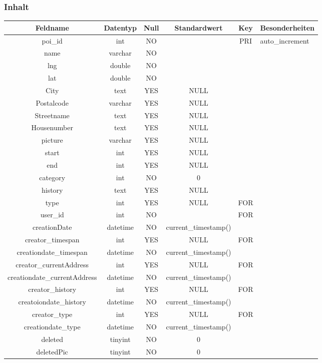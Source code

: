 \subsubsection{Inhalt}
\begin{longtable}[H]{|c|c|c|c|c|p{2.9cm}|}
		\hline
		\textbf{Feldname} & \textbf{Datentyp} & \textbf{Null} & \textbf{Standardwert} & \textbf{Key}   & \textbf{Besonderheiten} \\ \hline
		poi\_id & int & NO &  & PRI & auto\_increment \\ \hline
		name & varchar & NO &  &  & \\ \hline
		lng & double & NO &  &  & \\ \hline
		lat & double & NO &  &  & \\ \hline
		City & text & YES & NULL &  & \\ \hline
		Postalcode & varchar & YES & NULL &  & \\ \hline
		Streetname & text & YES & NULL &  & \\ \hline
		Housenumber & text & YES & NULL &  & \\ \hline
		picture & varchar & YES & NULL &  & \\ \hline
		start & int & YES & NULL &  & \\ \hline
		end & int & YES & NULL &  & \\ \hline
		category & int & NO & 0 &  & \\ \hline
		history & text & YES & NULL &  & \\ \hline
		type & int & YES & NULL & FOR & \\ \hline
		user\_id & int & NO &  & FOR & \\ \hline
		creationDate & datetime & NO & current\_timestamp() &  & \\ \hline
		creator\_timespan & int & YES & NULL & FOR & \\ \hline
		creationdate\_timespan & datetime & NO & current\_timestamp() &  & \\ \hline
		creator\_currentAddress & int & YES & NULL & FOR & \\ \hline
		creationdate\_currentAddress & datetime & NO & current\_timestamp() &  & \\ \hline
		creator\_history & int & YES & NULL & FOR & \\ \hline
		creatoiondate\_history & datetime & NO & current\_timestamp() &  & \\ \hline
		creator\_type & int & YES & NULL & FOR & \\ \hline
		creationdate\_type & datetime & NO & current\_timestamp() &  & \\ \hline
		deleted & tinyint & NO & 0 &  & \\ \hline
		deletedPic & tinyint & NO & 0 &  & \\ \hline
\end{longtable}
